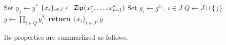 \documentclass{iacrtrans}
\begin{document}
\begin{minipage}{0.96\textwidth}
\begin{algorithm}[H]
    \centering
    \caption{$\mathcal{D}\hspace{1pt}(
	\hspace{1pt}y^*,
	x_1^*, \dots, x_{t-1}^*
	\hspace{1pt};
	j\hspace{1pt},
	J
)$}\label{alg_shamir_simulation}
    \begin{algorithmic}[1]
    	\vspace{4pt}
    	\State
    		Set $y_j \leftarrow y^*$\vspace{6pt}
    	\State
    		$\{x_i\}_{i \in J} \leftarrow
    		\mathsf{Zip}\hspace{0.75pt}
    		(\hspace{0.5pt}x_1^*, \dots, x_{t-1}^*)$\vspace{6pt}
		\State
    		Set $y_i \leftarrow g ^ {x_i},\ i \in J$\vspace{6pt}
    	\State
    		$Q \leftarrow J \cup \{\hspace{1pt}j\hspace{1pt}\}$\vspace{6pt}
    	\State
    		$y \leftarrow \prod_{i \in Q} y_i ^ {\lambda_i}$\vspace{6pt}
		\State
			\textbf{return $\{x_i\}_{i \in J}, y$}\vspace{5pt}
    \end{algorithmic}
\end{algorithm}
\vspace{0pt}
\end{minipage}

\noindent
Its properties are summarlized as follows.
\end{document}
